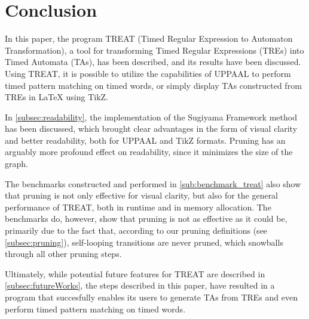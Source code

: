 \section{Conclusion}


In this paper, the program TREAT (Timed Regular Expression to Automaton Transformation), a tool for transforming Timed Regular Expressions (TREs) into Timed Automata (TAs), has been described, and its results have been discussed.
Using TREAT, it is possible to utilize the capabilities of UPPAAL to perform timed pattern matching on timed words, or simply display TAs constructed from TREs in LaTeX using TikZ.

In \cref{subsec:readability}, the implementation of the Sugiyama Framework method has been discussed, which brought clear advantages in the form of visual clarity and better readability, both for UPPAAL and TikZ formats.
Pruning has an arguably more profound effect on readability, since it minimizes the size of the graph.

The benchmarks constructed and performed in \cref{sub:benchmark_treat} also show that pruning is not only effective for visual clarity, but also for the general performance of TREAT, both in runtime and in memory allocation.
The benchmarks do, however, show that pruning is not as effective as it could be, primarily due to the fact that, according to our pruning definitions (see \cref{subsec:pruning}), self-looping transitions are never pruned, which snowballs through all other pruning steps.

Ultimately, while potential future features for TREAT are described in \cref{subsec:futureWorks}, the steps described in this paper, have resulted in a program that succesfully enables its users to generate TAs from TREs and even perform timed pattern matching on timed words.
